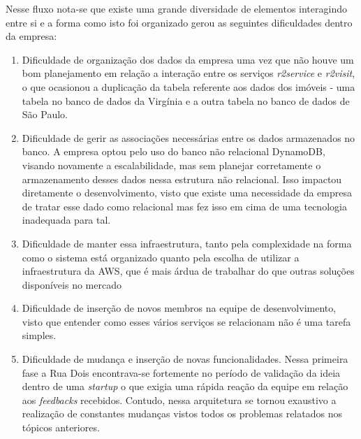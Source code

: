 Nesse fluxo nota-se que existe uma grande diversidade de elementos interagindo entre
si e a forma como isto foi organizado gerou as seguintes dificuldades dentro da empresa:

    \begin{enumerate}
        \item{Dificuldade de organização dos dados da empresa uma vez que não houve
        um bom planejamento em relação a interação entre os serviços \textit{r2service}
        e \textit{r2visit}, o que ocasionou a duplicação da tabela referente aos dados
        dos imóveis - uma tabela no banco de dados da Virgínia e a outra tabela no banco
        de dados de São Paulo.}
        \item{Dificuldade de gerir as associações necessárias entre os dados armazenados
        no banco. A empresa optou pelo uso do banco não relacional DynamoDB, visando
        novamente a escalabilidade, mas sem planejar corretamente o armazenamento desses
        dados nessa estrutura não relacional. Isso impactou diretamente o desenvolvimento,
        visto que existe uma necessidade da empresa de tratar esse dado como relacional
        mas fez isso em cima de uma tecnologia inadequada para tal.}
        \item{Dificuldade de manter essa infraestrutura, tanto pela complexidade na forma
        como o sistema está organizado quanto pela escolha de utilizar a infraestrutura da
        AWS, que é mais árdua de trabalhar do que outras soluções disponíveis no mercado
        \cite{kavya}}
        \item{Dificuldade de inserção de novos membros na equipe de desenvolvimento, visto
        que entender como esses vários serviços se relacionam não é uma tarefa simples.}
        \item{Dificuldade de mudança e inserção de novas funcionalidades. Nessa primeira
        fase a Rua Dois encontrava-se fortemente no período de validação da ideia dentro
        de uma \textit{startup} o que exigia uma rápida reação da equipe em relação aos
        \textit{feedbacks} recebidos. Contudo, nessa arquitetura se tornou exaustivo a
        realização de constantes mudanças vistos todos os problemas relatados nos tópicos
        anteriores.}
    \end{enumerate}


